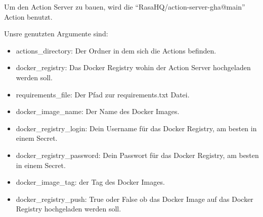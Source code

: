 Um den Action Server zu bauen, wird die ``RasaHQ/action-server-gha@main'' Action\cite{actionServerAction} benutzt.

Unsre genutzten Argumente sind:


\begin{itemize}
    \item actions\_directory: Der Ordner in dem sich die Actions befinden.
    \item docker\_registry: Das Docker Registry wohin der Action Server hochgeladen werden soll.
    \item requirements\_file: Der Pfad zur requirements.txt Datei.
    \item docker\_image\_name: Der Name des Docker Images.
    \item docker\_registry\_login: Dein Username für das Docker Registry, am besten in einem Secret.
    \item docker\_registry\_password: Dein Passwort für das Docker Registry, am besten in einem Secret.
    \item docker\_image\_tag: der Tag des Docker Images.
    \item docker\_registry\_push: True oder False ob das Docker Image auf das Docker Registry hochgeladen werden soll.
\end{itemize}


